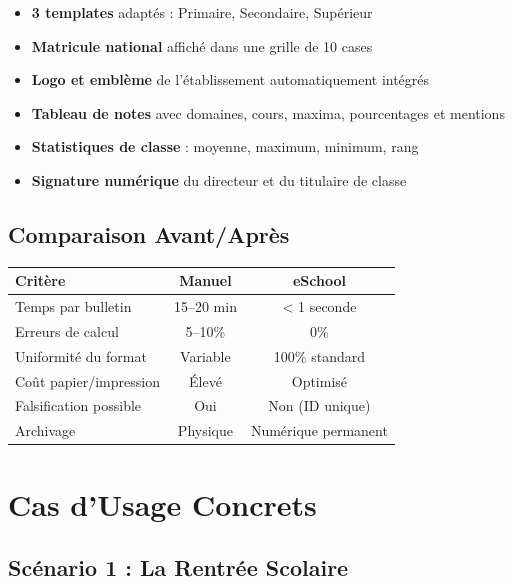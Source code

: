 \documentclass[12pt,a4paper,oneside]{report}
\begin{document}
\begin{itemize}
  \item \textbf{3 templates} adaptés : Primaire, Secondaire, Supérieur
  \item \textbf{Matricule national} affiché dans une grille de 10 cases
  \item \textbf{Logo et emblème} de l'établissement automatiquement intégrés
  \item \textbf{Tableau de notes} avec domaines, cours, maxima, pourcentages et mentions
  \item \textbf{Statistiques de classe} : moyenne, maximum, minimum, rang
  \item \textbf{Signature numérique} du directeur et du titulaire de classe
\end{itemize}

\section{Comparaison Avant/Après}

\begin{center}
\begin{tabularx}{\textwidth}{X c c}
\toprule
\textbf{Critère} & \textbf{Manuel} & \textbf{eSchool} \\
\midrule
Temps par bulletin & 15--20 min & < 1 seconde \\
Erreurs de calcul & 5--10\% & 0\% \\
Uniformité du format & Variable & 100\% standard \\
Coût papier/impression & Élevé & Optimisé \\
Falsification possible & Oui & Non (ID unique) \\
Archivage & Physique & Numérique permanent \\
\bottomrule
\end{tabularx}
\end{center}


\chapter{Cas d'Usage Concrets}

\section{Scénario 1 : La Rentrée Scolaire}
\end{document}
